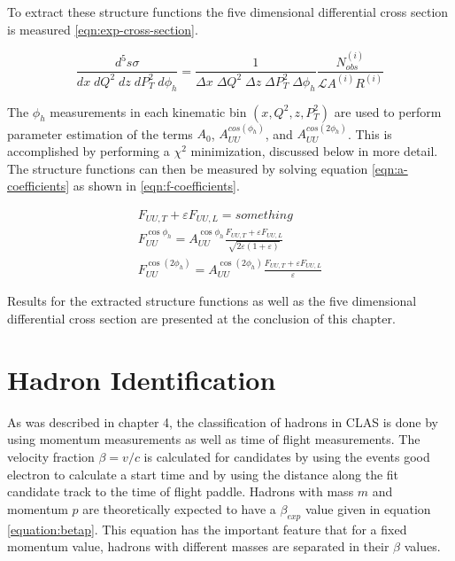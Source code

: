 To extract these structure functions the five dimensional differential cross section is measured \ref{eqn:exp-cross-section}.

\begin{equation}
	\label{eqn:exp-cross-section}
	\frac{d^5s\sigma}{dx \; dQ^2 \; dz \; dP_T^2 \; d\phi_h} = \frac{1}{\Delta x \; \Delta Q^2 \; \Delta z \; \Delta P_T^2 \; \Delta \phi_h} \frac{N_{obs}^{(i)}}{\mathcal{L} A^{(i)} R^{(i)}} 
\end{equation}

The $\phi_h$ measurements in each kinematic bin $(x, Q^2, z, P_T^2)$ are used to perform parameter estimation of the terms $A_{0}$, $A_{UU}^{cos(\phi_h)}$, and $A_{UU}^{cos(2\phi_h)}$.  This is accomplished by performing a $\chi^2$ minimization, discussed below in more detail.  The structure functions can then be measured by solving equation \ref{eqn:a-coefficients} as shown in \ref{eqn:f-coefficients}.

\begin{gather}
	F_{UU,T} + \varepsilon F_{UU,L} = something \\
	F_{UU}^{\cos\phi_h} = A_{UU}^{\cos\phi_h}  \frac{ F_{UU,T} + \varepsilon F_{UU,L}}{\sqrt{2\varepsilon(1+\varepsilon)}} \\
	F_{UU}^{\cos(2\phi_h)} = A_{UU}^{\cos(2\phi_h)} \frac{ F_{UU,T} + \varepsilon F_{UU,L}}{\varepsilon}
\end{gather}

Results for the extracted structure functions as well as the five dimensional differential cross section are presented at the conclusion of this chapter.  

\section{Hadron Identification}
%
%

As was described in chapter 4, the classification of hadrons in CLAS is done by using momentum measurements as well as time of flight measurements.  The velocity fraction $\beta = v/c$ is calculated for candidates by using the events good electron to calculate a start time and by using the distance along the fit candidate track to the time of flight paddle.  Hadrons with mass $m$ and momentum $p$ are theoretically expected to have a $\beta_{exp}$ value given in equation \ref{equation:betap}.  This equation has the important feature that for a fixed momentum value, hadrons with different masses are separated in their $\beta$ values.

